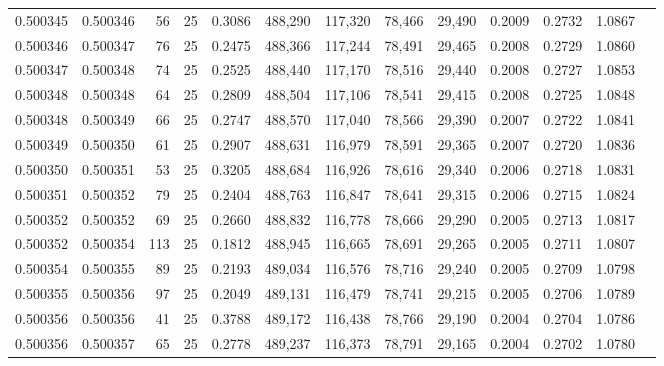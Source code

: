 \begin{tabular}{rrrrrrrrrrrrr}
0.500345 & 0.500346 &  56 &  25 &                                     0.3086 & 488,290 & 117,320 &  78,466 &  29,490 & 0.2009 & 0.2732 & 1.0867 \\
0.500346 & 0.500347 &  76 &  25 &                                     0.2475 & 488,366 & 117,244 &  78,491 &  29,465 & 0.2008 & 0.2729 & 1.0860 \\
0.500347 & 0.500348 &  74 &  25 &                                     0.2525 & 488,440 & 117,170 &  78,516 &  29,440 & 0.2008 & 0.2727 & 1.0853 \\
0.500348 & 0.500348 &  64 &  25 &                                     0.2809 & 488,504 & 117,106 &  78,541 &  29,415 & 0.2008 & 0.2725 & 1.0848 \\
0.500348 & 0.500349 &  66 &  25 &                                     0.2747 & 488,570 & 117,040 &  78,566 &  29,390 & 0.2007 & 0.2722 & 1.0841 \\
0.500349 & 0.500350 &  61 &  25 &                                     0.2907 & 488,631 & 116,979 &  78,591 &  29,365 & 0.2007 & 0.2720 & 1.0836 \\
0.500350 & 0.500351 &  53 &  25 &                                     0.3205 & 488,684 & 116,926 &  78,616 &  29,340 & 0.2006 & 0.2718 & 1.0831 \\
0.500351 & 0.500352 &  79 &  25 &                                     0.2404 & 488,763 & 116,847 &  78,641 &  29,315 & 0.2006 & 0.2715 & 1.0824 \\
0.500352 & 0.500352 &  69 &  25 &                                     0.2660 & 488,832 & 116,778 &  78,666 &  29,290 & 0.2005 & 0.2713 & 1.0817 \\
0.500352 & 0.500354 & 113 &  25 &                                     0.1812 & 488,945 & 116,665 &  78,691 &  29,265 & 0.2005 & 0.2711 & 1.0807 \\
0.500354 & 0.500355 &  89 &  25 &                                     0.2193 & 489,034 & 116,576 &  78,716 &  29,240 & 0.2005 & 0.2709 & 1.0798 \\
0.500355 & 0.500356 &  97 &  25 &                                     0.2049 & 489,131 & 116,479 &  78,741 &  29,215 & 0.2005 & 0.2706 & 1.0789 \\
0.500356 & 0.500356 &  41 &  25 &                                     0.3788 & 489,172 & 116,438 &  78,766 &  29,190 & 0.2004 & 0.2704 & 1.0786 \\
0.500356 & 0.500357 &  65 &  25 &                                     0.2778 & 489,237 & 116,373 &  78,791 &  29,165 & 0.2004 & 0.2702 & 1.0780 \\

\end{tabular}
